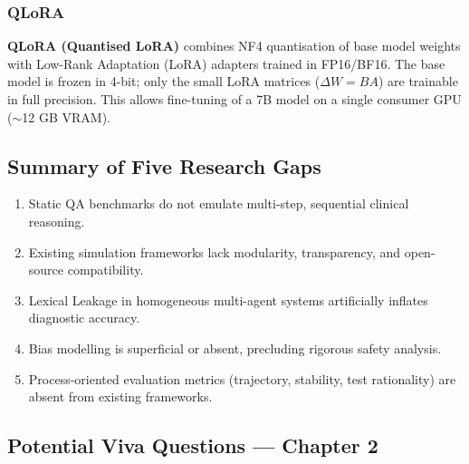 \subsubsection{QLoRA}

\begin{acadbox}[\textcolor{white}{Academic Definition}]
\textbf{QLoRA (Quantised LoRA)} combines NF4 quantisation of base model weights with Low-Rank Adaptation (LoRA) adapters trained in FP16/BF16. The base model is frozen in 4-bit; only the small LoRA matrices ($\Delta W = BA$) are trainable in full precision. This allows fine-tuning of a 7B model on a single consumer GPU ($\sim$12 GB VRAM).
\end{acadbox}

\subsection{Summary of Five Research Gaps}

\begin{enumerate}
    \item Static QA benchmarks do not emulate multi-step, sequential clinical reasoning.
    \item Existing simulation frameworks lack modularity, transparency, and open-source compatibility.
    \item Lexical Leakage in homogeneous multi-agent systems artificially inflates diagnostic accuracy.
    \item Bias modelling is superficial or absent, precluding rigorous safety analysis.
    \item Process-oriented evaluation metrics (trajectory, stability, test rationality) are absent from existing frameworks.
\end{enumerate}

\subsection{Potential Viva Questions --- Chapter 2}

